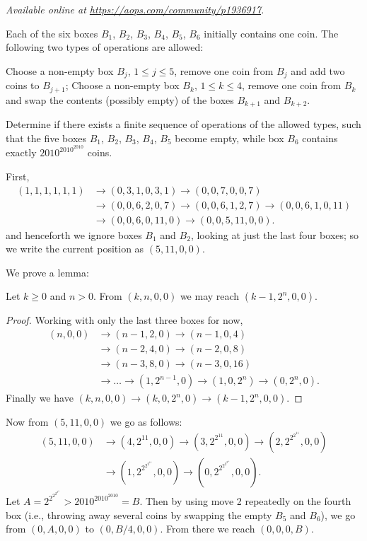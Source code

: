 \textsl{Available online at \url{https://aops.com/community/p1936917}.}
\begin{mdframed}[style=mdpurplebox,frametitle={Problem statement}]
Each of the six boxes $B_1$, $B_2$, $B_3$, $B_4$, $B_5$, $B_6$
initially contains one coin.
The following two types of operations are allowed:
\begin{enumerate}
  \ii Choose a non-empty box $B_j$, $1\leq j \leq 5$,
  remove one coin from $B_j$ and add two coins to $B_{j+1}$;
  \ii Choose a non-empty box $B_k$, $1\leq k \leq 4$,
  remove one coin from $B_k$ and swap the contents
  (possibly empty) of the boxes $B_{k+1}$ and $B_{k+2}$.
\end{enumerate}
Determine if there exists a finite sequence of operations of the allowed types,
such that the five boxes $B_1$, $B_2$, $B_3$, $B_4$, $B_5$ become empty,
while box $B_6$ contains exactly $2010^{2010^{2010}}$ coins.
\end{mdframed}
First,
\begin{align*}
  (1,1,1,1,1,1) &\to (0,3,1,0,3,1) \to (0,0,7,0,0,7) \\
  &\to (0,0,6,2,0,7) \to (0,0,6,1,2,7) \to (0,0,6,1,0,11) \\
  &\to (0,0,6,0,11,0) \to (0,0,5,11,0,0).
\end{align*}
and henceforth we ignore boxes $B_1$ and $B_2$,
looking at just the last four boxes;
so we write the current position as $(5,11,0,0)$.

We prove a lemma:
\begin{claim*}
  Let $k \ge 0$ and $n > 0$.
  From $(k,n,0,0)$ we may reach $(k-1,2^n,0,0)$.
\end{claim*}
\begin{proof}
  Working with only the last three boxes for now,
  \begin{align*}
    (n,0,0) &\to (n-1, 2, 0) \to (n-1, 0, 4) \\
    &\to (n-2, 4, 0) \to (n-2, 0, 8) \\
    &\to (n-3, 8, 0) \to (n-3, 0, 16) \\
    &\to \dots \to (1, 2^{n-1}, 0) \to (1, 0, 2^n) \to (0, 2^n, 0).
  \end{align*}
  Finally we have $(k,n,0,0) \to (k,0,2^n,0) \to (k-1,2^n, 0,0)$.
\end{proof}

Now from $(5,11,0,0)$ we go as follows:
\begin{align*} (5,11,0,0) &\to (4, 2^{11}, 0, 0)
  \to \left(3, 2^{2^{11}}, 0, 0\right)
  \to \left(2, 2^{2^{2^{11}}}, 0, 0\right) \\
  &\to \left( 1, 2^{2^{2^{2^{11}}}}, 0, 0\right)
  \to \left(0, 2^{2^{2^{2^{2^{11}}}}}, 0, 0\right).
\end{align*}
Let $A = 2^{2^{2^{2^{2^{11}}}}} > 2010^{2010^{2010}} = B$.
Then by using move 2 repeatedly on the fourth box
(i.e., throwing away several coins by swapping the empty $B_5$ and $B_6$),
we go from $(0,A,0,0)$ to $(0,B/4,0,0)$.
From there we reach $(0,0,0,B)$.
\pagebreak